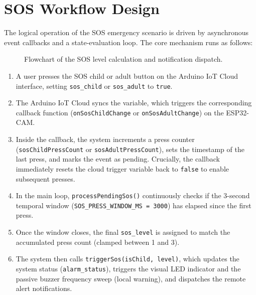 \documentclass[conference]{IEEEtran}
\begin{document}
\section{SOS Workflow Design}
The logical operation of the SOS emergency scenario is driven by asynchronous event callbacks and a state-evaluation loop. The core mechanism runs as follows:

\begin{figure}[!t]
\centering
{}
\caption{Flowchart of the SOS level calculation and notification dispatch.}
\label{fig:workflow}
\end{figure}

\begin{enumerate}
    \item A user presses the SOS child or adult button on the Arduino IoT Cloud interface, setting \texttt{sos\_child} or \texttt{sos\_adult} to \texttt{true}.
    \item The Arduino IoT Cloud syncs the variable, which triggers the corresponding callback function (\texttt{onSosChildChange} or \texttt{onSosAdultChange}) on the ESP32-CAM.
    \item Inside the callback, the system increments a press counter (\texttt{sosChildPressCount} or \texttt{sosAdultPressCount}), sets the timestamp of the last press, and marks the event as pending. Crucially, the callback immediately resets the cloud trigger variable back to \texttt{false} to enable subsequent presses.
    \item In the main loop, \texttt{processPendingSos()} continuously checks if the 3-second temporal window (\texttt{SOS\_PRESS\_WINDOW\_MS = 3000}) has elapsed since the first press.
    \item Once the window closes, the final \texttt{sos\_level} is assigned to match the accumulated press count (clamped between 1 and 3).
    \item The system then calls \texttt{triggerSos(isChild, level)}, which updates the system status (\texttt{alarm\_status}), triggers the visual LED indicator and the passive buzzer frequency sweep (local warning), and dispatches the remote alert notifications.
\end{enumerate}
\end{document}
